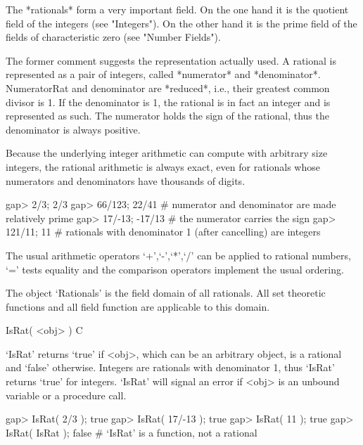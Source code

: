 
The *rationals*  form  a very important field.  On the one hand it is the
quotient field of the integers (see "Integers").  On the other hand it is
the prime field of the fields of characteristic zero  (see "Number Fields").

The former comment suggests the representation actually used.  A rational
is  represented   as   a   pair   of  integers,  called  *numerator*  and
*denominator*.   NumeratorRat  and  denominator are  *reduced*, i.e.,  their
greatest common divisor is 1.  If  the denominator  is 1, the rational is
in fact an integer and is represented as such.   The numerator holds  the
sign of the rational, thus the denominator is always positive.

Because the underlying integer arithmetic can compute with arbitrary size
integers, the  rational arithmetic is  always  exact, even  for rationals
whose numerators and denominators have thousands of digits.

\beginexample
gap> 2/3;
2/3
gap> 66/123;
22/41    # numerator and denominator are made relatively prime
gap> 17/-13;
-17/13    # the numerator carries the sign
gap> 121/11;
11    # rationals with denominator 1 (after cancelling) are integers
\endexample

The usual arithmetic operators `+',`-',`*',`/' can be applied to rational
numbers, `=' tests equality and the comparison operators implement the usual
ordering.

The {\GAP} object `Rationals' is the field domain  of all rationals.  All
set  theoretic  functions  and all field function are applicable to this
domain.


\>IsRat( <obj> ) C

`IsRat' returns `true' if <obj>,  which can be  an arbitrary object, is a
rational and `false' otherwise.   Integers are rationals with denominator
1,   thus `IsRat' returns  `true' for  integers.   `IsRat' will signal an
error if <obj> is an unbound variable or a procedure call.

\beginexample
gap> IsRat( 2/3 );
true
gap> IsRat( 17/-13 );
true
gap> IsRat( 11 );
true
gap> IsRat( IsRat );
false    # `IsRat' is a function, not a rational 
\endexample


